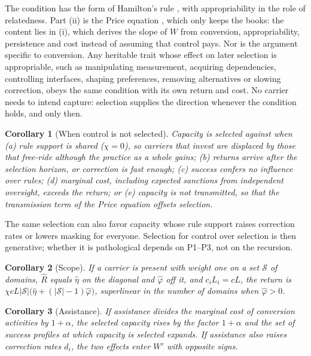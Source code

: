 \documentclass[letterpaper]{article} %
\newtheorem{corollary}{Corollary}
\theoremstyle{definition}
\newcommand{\cS}{\mathcal{S}}
\begin{document}
The condition has the form of Hamilton's rule \citep{hamilton1964}, with appropriability in the role of relatedness. Part (ii) is the Price equation \citep{price1970}, which only keeps the books: the content lies in (i), which derives the slope of $W$ from conversion, appropriability, persistence and cost instead of assuming that control pays. Nor is the argument specific to conversion. Any heritable trait whose effect on later selection is appropriable, such as manipulating measurement, acquiring dependencies, controlling interfaces, shaping preferences, removing alternatives or slowing correction, obeys the same condition with its own return and cost. No carrier needs to intend capture: selection supplies the direction whenever the condition holds, and only then.

\begin{corollary}[When control is not selected]\label{cor:counter}
Capacity is selected against when (a) rule support is shared ($\chi=0$), so carriers that invest are displaced by those that free-ride although the practice as a whole gains; (b) returns arrive after the selection horizon, or correction is fast enough; (c) success confers no influence over rules; (d) marginal cost, including expected sanctions from independent oversight, exceeds the return; or (e) capacity is not transmitted, so that the transmission term of the Price equation offsets selection.
\end{corollary}

The same selection can also favor capacity whose rule support raises correction rates or lowers masking for everyone. Selection for control over selection is then generative; whether it is pathological depends on P1--P3, not on the recursion.

\begin{corollary}[Scope]\label{cor:scope}
If a carrier is present with weight one on a set $\cS$ of domains, $\hat R$ equals $\hat\eta$ on the diagonal and $\hat\varphi$ off it, and $c_iL_i=cL$, the return is $\chi cL|\cS|\big(\hat\eta+(|\cS|-1)\hat\varphi\big)$, superlinear in the number of domains when $\hat\varphi>0$.
\end{corollary}

\begin{corollary}[Assistance]\label{cor:assist}
If assistance divides the marginal cost of conversion activities by $1+\alpha$, the selected capacity rises by the factor $1+\alpha$ and the set of success profiles at which capacity is selected expands. If assistance also raises correction rates $d_i$, the two effects enter $W'$ with opposite signs.
\end{corollary}
\end{document}
